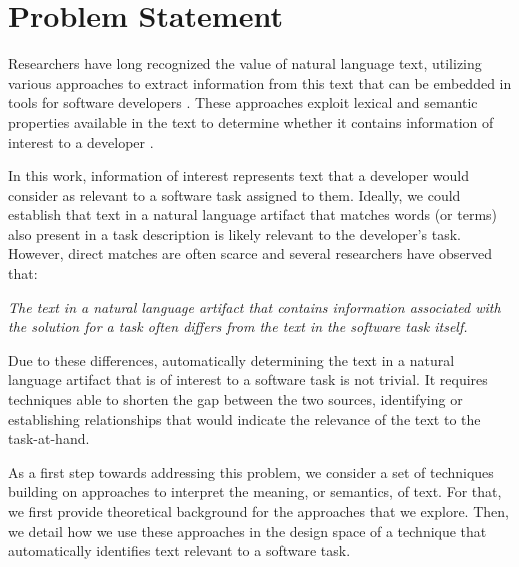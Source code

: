 
\section{Problem Statement}
\label{cp5:motivation}





Researchers have long recognized the value of natural language
text, utilizing various approaches to extract
information from this text that can be embedded in
tools for software developers .
These approaches exploit lexical and semantic properties available in the text to determine 
whether it contains information of interest to a developer . 


In this work, information of interest represents text that a developer would consider as relevant to a software task assigned to them. Ideally, we could establish that text in a natural language artifact that matches  
words (or terms) also present in a task description is likely relevant to the developer's task. However, direct matches are often scarce  and several researchers have observed that:



\medskip
\begin{bluequote}
    \textit{The text in a natural language artifact that contains information associated with the solution for a task often differs from the text in the software task itself.}
\end{bluequote}



Due to these differences, automatically determining the text in a natural language artifact that is of interest to a software task is not trivial. 
It requires techniques able to shorten the gap between the two sources, identifying or establishing relationships that would indicate the relevance of the text to the task-at-hand.


As a first step towards addressing this problem, we consider a set of techniques
 building on approaches to interpret the meaning, or semantics, of text.
 For that, we first provide theoretical background for the approaches that we explore. Then, we detail how we use these approaches in the design space of a technique that automatically identifies text relevant to a software task.






